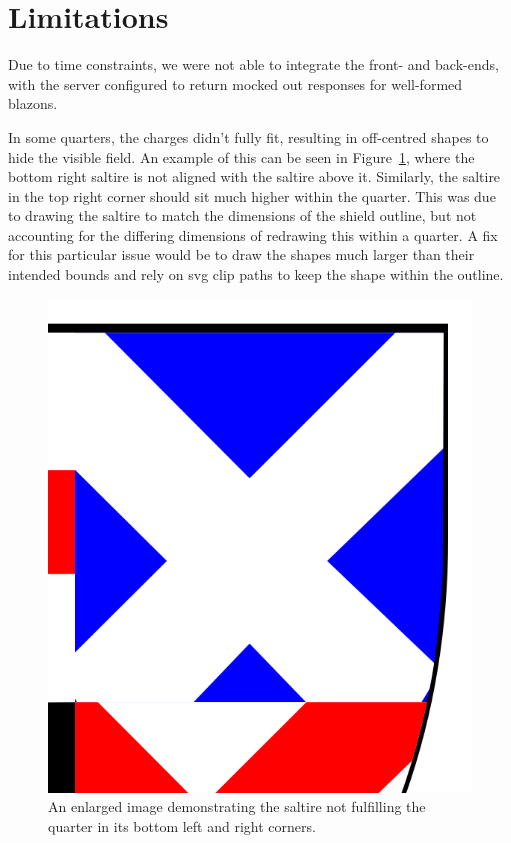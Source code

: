 \documentclass[nobib, a4paper, twoside, justified]{tufte-book}
\makeatletter
\newcommand{\svg}{\gls{svg}\@\xspace}
\makeatother
\begin{document}
\pagebreak%

\section{Limitations}%
\label{sec:shortcomings}

Due to time constraints, we were not able to integrate the front- and back-ends, with the server
configured to return mocked out responses for well-formed blazons.

In some quarters, the charges didn't fully fit, resulting in off-centred shapes to hide the visible
field. An example of this can be seen in Figure~\ref{fig:escaping_bounds}, where the bottom right
saltire is not aligned with the saltire above it. Similarly, the saltire in the top right corner
should sit much higher within the quarter. This was due to drawing the saltire to match the
dimensions of the shield outline, but not accounting for the differing dimensions of redrawing this
within a quarter. A fix for this particular issue would be to draw the shapes much larger than
their intended bounds and rely on \svg clip paths to keep the shape within the outline.

\begin{figure}[h]
  \centering
  \includegraphics[width=0.8\linewidth]{escaping_bounds}
  \caption{An enlarged image demonstrating the saltire not fulfilling the quarter in its bottom
  left and right corners.}
  \label{fig:escaping_bounds}
\end{figure}
\end{document}
